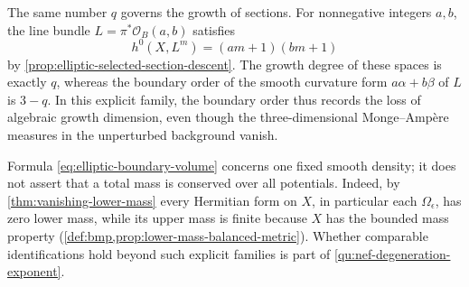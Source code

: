 The same number $q$ governs the growth of sections. For nonnegative integers $a,b$, the line bundle $L=\pi^*\mathcal O_B(a,b)$ satisfies
\[
 h^0(X,L^m)=(am+1)(bm+1)
\]
by \cref{prop:elliptic-selected-section-descent}. The growth degree of these spaces is exactly $q$, whereas the boundary order of the smooth curvature form $a\alpha+b\beta$ of $L$ is $3-q$. In this explicit family, the boundary order thus records the loss of algebraic growth dimension, even though the three-dimensional Monge--Amp\`ere measures in the unperturbed background vanish.

Formula \eqref{eq:elliptic-boundary-volume} concerns one fixed smooth density; it does not assert that a total mass is conserved over all potentials. Indeed, by \cref{thm:vanishing-lower-mass} every Hermitian form on $X$, in particular each $\Omega_\epsilon$, has zero lower mass, while its upper mass is finite because $X$ has the bounded mass property (\cref{def:bmp,prop:lower-mass-balanced-metric}). Whether comparable identifications hold beyond such explicit families is part of \cref{qu:nef-degeneration-exponent}.
